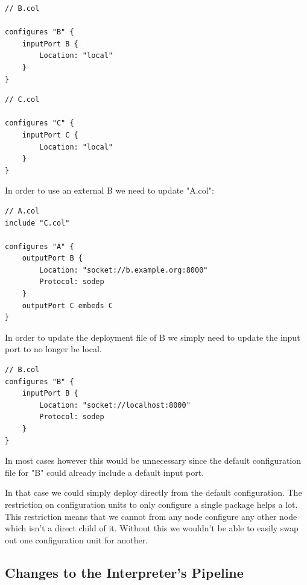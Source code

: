 \begin{verbatim}
// B.col

configures "B" {
    inputPort B {
        Location: "local"
    }
}
\end{verbatim}

\begin{verbatim}
// C.col

configures "C" {
    inputPort C {
        Location: "local"
    }
}
\end{verbatim}

In order to use an external B we need to update "A.col":

\begin{verbatim}
// A.col
include "C.col"

configures "A" {
    outputPort B {
        Location: "socket://b.example.org:8000"
        Protocol: sodep
    }
    outputPort C embeds C
}
\end{verbatim}

In order to update the deployment file of B we simply need to update the
input port to no longer be local.

\begin{verbatim}
// B.col
configures "B" {
    inputPort B {
        Location: "socket://localhost:8000"
        Protocol: sodep
    }
}
\end{verbatim}

In most cases however this would be unnecessary since the default
configuration file for "B" could already include a default input port.

In that case we could simply deploy directly from the default configuration.
The restriction on configuration units to only configure a single package helps
a lot. This restriction means that we cannot from any node configure any other
node which isn't a direct child of it. Without this we wouldn't be able to
easily swap out one configuration unit for another.

\subsection{Changes to the Interpreter's Pipeline}

